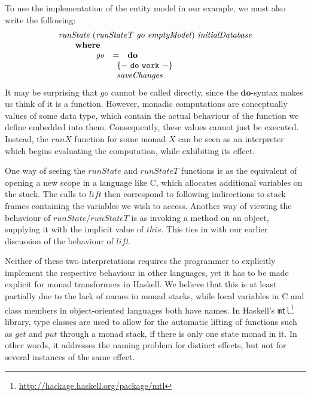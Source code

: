 To use the implementation of the entity model in our example, we must also write the following:
\begin{displaymath}
\begin{array}{l}
\mathit{runState}~(\mathit{runStateT}~\mathit{go}~\mathit{emptyModel})~\mathit{initialDatabase} \\
\qquad \mathbf{where} \\
\qquad \qquad \begin{array}{lcl}
\mathit{go} & = & \mathbf{do} \\
\multicolumn{3}{l}{\qquad \begin{array}{l}
\mathtt{\{-~do~work~-\}}\\
\mathit{saveChanges}
\end{array}} 
\end{array}
\end{array}
\end{displaymath}
It may be surprising that $\mathit{go}$ cannot be called directly, since the $\mathbf{do}$-syntax makes us think of it is a function.
However, monadic computations are conceptually values of some data type,
which contain the actual behaviour of the function we define embedded into them.
Consequently, these values cannot just be executed. Instead, the $\mathit{runX}$ function for some monad $X$ can be seen as an interpreter which begins evaluating the computation, while exhibiting its effect.

One way of seeing the $\mathit{runState}$ and $\mathit{runStateT}$ functions is as the equivalent of opening a new scope in a language like C, which allocates
additional variables on the stack.
The calls to $\mathit{lift}$ then correspond to following indirections to stack frames containing the variables we wish to access. Another way of viewing the behaviour of $\mathit{runState}$/$\mathit{runStateT}$ is as invoking a method on an object, supplying it with the implicit value of $\mathit{this}$. This ties in with our earlier discussion of the behaviour of $\mathit{lift}$.

Neither of these two interpretations requires the programmer to explicitly implement the respective behaviour in other languages, yet it has to be made explicit for monad transformers in Haskell. We believe that this is at least partially due to the lack of names in monad stacks, while local variables in C and class members in object-oriented languages both have names. In Haskell's \texttt{mtl}\footnote{\url{http://hackage.haskell.org/package/mtl}} library, type classes are used to allow for the automatic lifting of functions such as $\mathit{get}$ and $\mathit{put}$ through a monad stack, if there is only one state monad in it. In other words, it addresses the naming problem for distinct effects, but not for several instances of the same effect.

